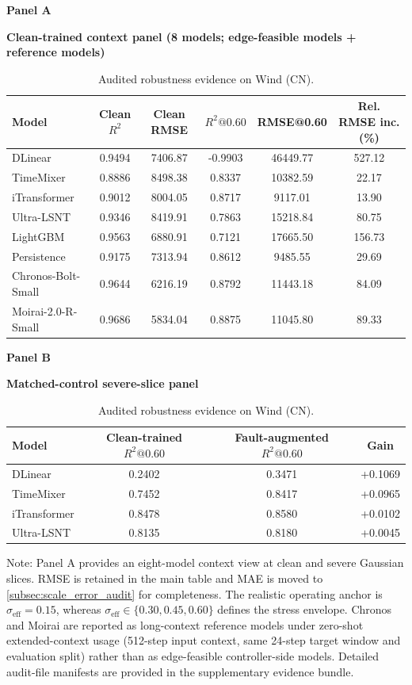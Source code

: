 ﻿\documentclass[review,1p,times]{elsarticle}
\newcommand{\aePanelHeading}[2]{%
  \par\vspace{2pt}%
  \noindent\begin{minipage}{\linewidth}
    \centering
    \textbf{#1}\par
    \textbf{#2}\par
  \end{minipage}%
  \par\vspace{2pt}%
}
\newcommand{\aeTableNote}[1]{%
  \par\vspace{2pt}%
  \noindent\begin{minipage}{\linewidth}
    \raggedright\footnotesize
    Note: #1
  \end{minipage}%
  \par
}
\begin{document}
\begin{table}[t]
\centering
\caption{Audited robustness evidence on Wind (CN).}
\label{tab:table2_comprehensive}
\label{tab:main4_perf_robust_transfer}
\label{tab:main_wind_cn}
\label{tab:master_robustness}
\footnotesize
\setlength{\tabcolsep}{4pt}
\aePanelHeading{Panel A}{Clean-trained context panel (8 models; edge-feasible models + reference models)}
\begin{tabular*}{\linewidth}{@{\extracolsep{\fill}}lccccc@{}}
\toprule
\textbf{Model} & \textbf{Clean $R^2$} & \textbf{Clean RMSE} & \textbf{$R^2@0.60$} & \textbf{RMSE@0.60} & \textbf{Rel. RMSE inc. (\%)} \\
\midrule
DLinear & 0.9494 & 7406.87 & -0.9903 & 46449.77 & 527.12 \\
TimeMixer & 0.8886 & 8498.38 & 0.8337 & 10382.59 & 22.17 \\
iTransformer & 0.9012 & 8004.05 & 0.8717 & 9117.01 & 13.90 \\
Ultra-LSNT & 0.9346 & 8419.91 & 0.7863 & 15218.84 & 80.75 \\
LightGBM & 0.9563 & 6880.91 & 0.7121 & 17665.50 & 156.73 \\
Persistence & 0.9175 & 7313.94 & 0.8612 & 9485.55 & 29.69 \\
Chronos-Bolt-Small & 0.9644 & 6216.19 & 0.8792 & 11443.18 & 84.09 \\
Moirai-2.0-R-Small & 0.9686 & 5834.04 & 0.8875 & 11045.80 & 89.33 \\
\bottomrule
\end{tabular*}
\vspace{4pt}
\aePanelHeading{Panel B}{Matched-control severe-slice panel}
\begin{tabular*}{0.92\linewidth}{@{\extracolsep{\fill}}lccc@{}}
\toprule
\textbf{Model} & \textbf{Clean-trained $R^2@0.60$} & \textbf{Fault-augmented $R^2@0.60$} & \textbf{Gain} \\
\midrule
DLinear & 0.2402 & 0.3471 & +0.1069 \\
TimeMixer & 0.7452 & 0.8417 & +0.0965 \\
iTransformer & 0.8478 & 0.8580 & +0.0102 \\
Ultra-LSNT & 0.8135 & 0.8180 & +0.0045 \\
\bottomrule
\end{tabular*}
\aeTableNote{Panel A provides an eight-model context view at clean and severe Gaussian slices. RMSE is retained in the main table and MAE is moved to \ref{subsec:scale_error_audit} for completeness. The realistic operating anchor is $\sigma_{\mathrm{eff}}=0.15$, whereas $\sigma_{\mathrm{eff}}\in\{0.30,0.45,0.60\}$ defines the stress envelope. Chronos and Moirai are reported as long-context reference models under zero-shot extended-context usage (512-step input context, same 24-step target window and evaluation split) rather than as edge-feasible controller-side models. Detailed audit-file manifests are provided in the supplementary evidence bundle.}
\end{table}
\end{document}
